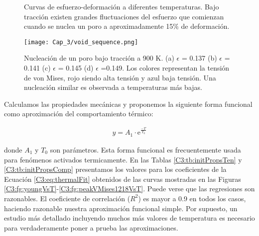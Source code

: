 
\begin{figure}[htp]
\centering
{}
\caption[Curvas de esfuerzo-deformación a diferentes temperaturas.]{Curvas de esfuerzo-deformación a diferentes temperaturas. Bajo tracción existen grandes fluctuaciones del esfuerzo que comienzan cuando se nuclea un poro a aproximadamente 15\% de deformación.}
\label{C3:fg:sStrain}
\end{figure}

\begin{figure}[htp]
\centering
\texttt{[image: Cap\_3/void\_sequence.png]}
\caption[Nucleación de un poro bajo tracción a 900 K.]{Nucleación de un poro bajo tracción a 900 K. (a) $\epsilon$ = 0.137 (b) $\epsilon$ = 0.141 (c) $\epsilon$ = 0.145 (d) $\epsilon$ =0.149. Los colores representan la tensión de von Mises, rojo siendo alta tensión y azul baja tensión. Una nucleación similar es observada a temperaturas más bajas.}
\label{C3:fg:voidSeq}
\end{figure}

Calculamos las propiedades mecánicas y proponemos la siguiente forma funcional como aproximación del comportamiento térmico:


\begin{eqnarray}
y = A_{1}\cdot \mathrm{e}^{\frac{-T}{T_{0}}}
\label{C3:eq:thermalFit}
\end{eqnarray}

donde $A_{1}$ y $T_{0}$ son parámetros. Esta forma funcional es frecuentemente usada para fenómenos activados termicamente. En las Tablas \ref{C3:tb:initPropsTen} y \ref{C3:tb:initPropsComp} presentamos los valores para los coeficientes de la Ecuación \ref{C3:eq:thermalFit} obtenidos de las curvas mostradas en las Figuras \ref{C3:fg:youngVsT}-\ref{C3:fg:peakVMises1218VsT}. Puede verse que las regresiones son razonables. El coeficiente de correlación ($R^2$) es mayor a 0.9 en todos los casos, haciendo razonable nuestra aproximación funcional simple. Por supuesto, un estudio más detallado incluyendo muchos más valores de temperatura es necesario para verdaderamente poner a prueba las aproximaciones.
	
